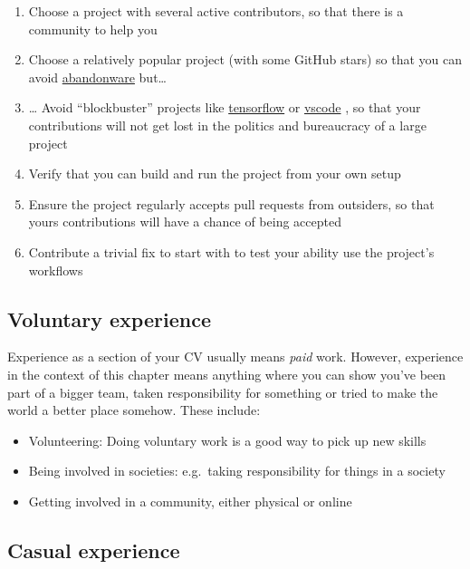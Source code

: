 \documentclass[
]{book}
\providecommand{\tightlist}{%
  \setlength{\itemsep}{0pt}\setlength{\parskip}{0pt}}
\begin{document}
\begin{enumerate}
\def\labelenumi{\arabic{enumi}.}
\tightlist
\item
  Choose a project with several active contributors, so that there is a community to help you
\item
  Choose a relatively popular project (with some GitHub stars) so that you can avoid \href{https://en.wikipedia.org/wiki/Abandonware}{abandonware} but\ldots{}
\item
  \ldots{} Avoid ``blockbuster'' projects like \href{https://github.com/tensorflow}{tensorflow} or \href{https://github.com/microsoft/vscode}{vscode} , so that your contributions will not get lost in the politics and bureaucracy of a large project
\item
  Verify that you can build and run the project from your own setup
\item
  Ensure the project regularly accepts pull requests from outsiders, so that yours contributions will have a chance of being accepted
\item
  Contribute a trivial fix to start with to test your ability use the project's workflows
\end{enumerate}

\hypertarget{volunteering}{%
\subsection{Voluntary experience}\label{volunteering}}

Experience as a section of your CV usually means \emph{paid} work. However, experience in the context of this chapter means anything where you can show you've been part of a bigger team, taken responsibility for something or tried to make the world a better place somehow. These include:

\begin{itemize}
\tightlist
\item
  Volunteering: Doing voluntary work is a good way to pick up new skills
\item
  Being involved in societies: e.g.~taking responsibility for things in a society
\item
  Getting involved in a community, either physical or online
\end{itemize}

\hypertarget{casual}{%
\subsection{Casual experience}\label{casual}}
\end{document}
